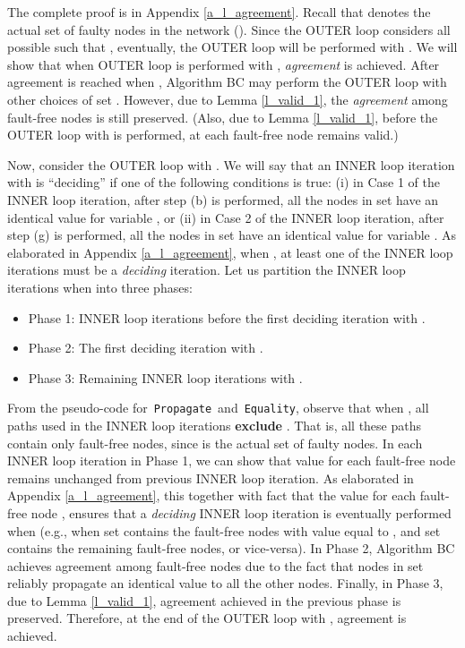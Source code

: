 \documentclass[letterpaper, 11pt]{article}
\newenvironment{proofSketch}{\noindent{\bf Proof Sketch:}}{\hspace*{\fill}}
\newcommand{\Propagate}{{\tt Propagate}}
\newcommand{\Equality}{{\tt Equality}}
\begin{document}
\begin{proofSketch}
The complete proof is in Appendix \ref{a_l_agreement}. Recall that  denotes the actual set of faulty nodes in the network (). Since the OUTER loop considers all possible  such that , eventually, the OUTER loop will be performed with .
 We will show that when OUTER loop is performed with , {\em agreement} is achieved.
After agreement
is reached when , Algorithm BC may perform the OUTER loop with other choices of set . However, due to Lemma \ref{l_valid_1}, the {\em agreement} among fault-free nodes is still preserved.
(Also, due to Lemma \ref{l_valid_1}, before the OUTER loop with  is performed,  at each fault-free node remains valid.)

Now, consider the OUTER loop with .
We will say that an INNER loop iteration with  is ``deciding'' if one of the following
conditions is true: (i) in Case 1 of the INNER loop iteration, after step (b) is performed,
all the nodes in set  have an identical value for variable ,
or (ii) in Case 2 of the INNER loop iteration, after step (g) is performed,
all the nodes in set  have an identical value for variable .
As elaborated in Appendix \ref{a_l_agreement},
when , at least one of the INNER loop
iterations must be a {\em deciding} iteration. 
Let us partition the INNER loop iterations when  into three phases:
\begin{itemize}
\item Phase 1: INNER loop iterations before the first deciding iteration with .
\item Phase 2: The first deciding iteration with .
\item Phase 3: Remaining INNER loop iterations with .
\end{itemize}

From the pseudo-code for~\Propagate~and~\Equality, observe that when , all paths
used in the INNER loop iterations {\bf exclude} . That is, all these paths contain only
fault-free nodes, since  is the actual set of faulty nodes.
In each INNER loop iteration in Phase 1, we can show that value  for each fault-free node  remains unchanged from previous INNER loop iteration. 
As elaborated in Appendix \ref{a_l_agreement},
this together with fact that the value  for each fault-free node , ensures that a {\em deciding} INNER loop iteration is eventually performed when
 (e.g., when set  contains the fault-free nodes with  value equal to , and set  contains the remaining fault-free nodes, or vice-versa).
 In Phase 2, Algorithm BC achieves agreement among fault-free nodes due to the fact that nodes in set  reliably propagate an identical value to all the other nodes. Finally, in Phase 3,
 due to Lemma \ref{l_valid_1},
 agreement achieved in the previous phase is preserved.
 Therefore, at the end of the OUTER loop with , agreement is achieved.
\end{proofSketch}
\end{document}
